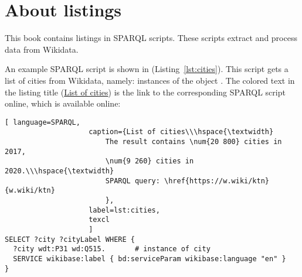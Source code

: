 
\section{About listings}

This book contains listings in SPARQL scripts.
These scripts extract and process data from Wikidata.%

An example SPARQL script is shown in (Listing~\ref{lst:cities}). 
This script gets a list of cities from Wikidata, 
namely: instances of the object .
The colored text in the listing title (\href{https://w.wiki/ktn}{List of cities}) 
is the link to the corresponding SPARQL script online, 
which is available online: 



\begin{lstlisting}[ language=SPARQL, 
                    caption={List of cities\\\hspace{\textwidth}
                        The result contains \num{20 800} cities in 2017, 
                        \num{9 260} cities in 2020.\\\hspace{\textwidth}
                        SPARQL query: \href{https://w.wiki/ktn}{w.wiki/ktn}
                        },
                    label=lst:cities,
                    texcl 
                    ]
SELECT ?city ?cityLabel WHERE { 
  ?city wdt:P31 wd:Q515.       # instance of city 
  SERVICE wikibase:label { bd:serviceParam wikibase:language "en" }
}
\end{lstlisting}%



